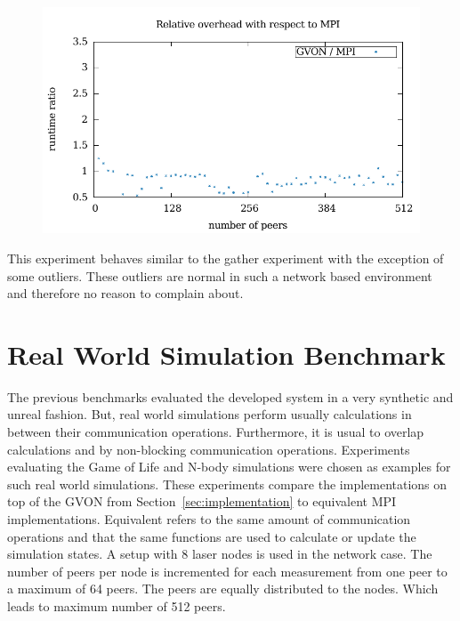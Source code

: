 \begin{figure}[H]
\begin{minipage}[t]{0.5\textwidth}
    \includegraphics[width=\textwidth]{plots/50_reduce_network_overhead_gvon_laser}
  \end{minipage}%
  \caption{ }
  \label{fig:reduce_laser}
\end{figure}

\noindent This experiment behaves similar to the gather experiment with the
exception of some outliers. These outliers are normal in such a
network based environment and therefore no reason to complain about.


\section{Real World Simulation Benchmark}
\label{sec:eval:real}
The previous benchmarks evaluated the developed system in a very
synthetic and unreal fashion. But, real world simulations perform
usually calculations in between their communication
operations. Furthermore, it is usual to overlap calculations and by
non-blocking communication operations. Experiments evaluating the Game
of Life and N-body simulations were chosen as examples for such real
world simulations. These experiments compare the implementations on
top of the GVON from Section~\ref{sec:implementation} to equivalent
MPI implementations.  Equivalent refers to the same amount of
communication operations and that the same functions are used to
calculate or update the simulation states. A setup with 8 laser nodes
is used in the network case. The number of peers per node is
incremented for each measurement from one peer to a maximum of 64
peers. The peers are equally distributed to the nodes.  Which leads to
maximum number of 512 peers.



